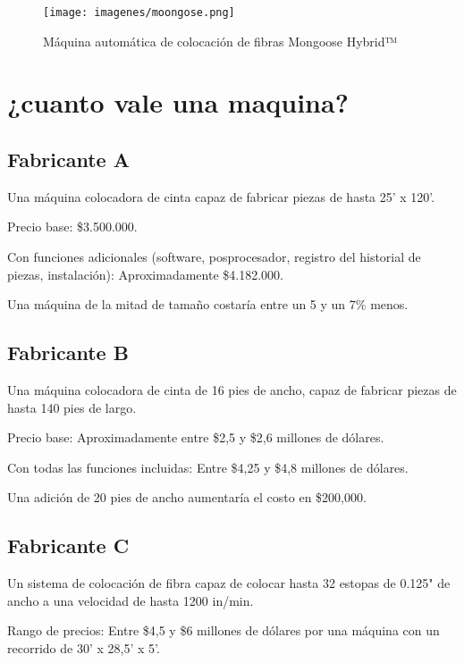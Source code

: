 \begin{enumerate}[label=\arabic*.]
\begin{figure}[h]
    \centering
    \texttt{[image: imagenes/moongose.png]}
    \caption{Máquina automática de colocación de fibras Mongoose Hybrid™}
    \label{fig:enter-label}
\end{figure}



\section{¿cuanto vale una maquina?}

\subsection{Fabricante A}

Una máquina colocadora de cinta capaz de fabricar piezas de hasta 25' x 120'.

Precio base: \$3.500.000.

Con funciones adicionales (software, posprocesador, registro del historial de piezas, instalación): Aproximadamente \$4.182.000.

Una máquina de la mitad de tamaño costaría entre un 5 y un 7\% menos.

\subsection{Fabricante B}

Una máquina colocadora de cinta de 16 pies de ancho, capaz de fabricar piezas de hasta 140 pies de largo.

Precio base: Aproximadamente entre \$2,5 y \$2,6 millones de dólares.

Con todas las funciones incluidas: Entre \$4,25 y \$4,8 millones de dólares.

Una adición de 20 pies de ancho aumentaría el costo en \$200,000.

\subsection*{Fabricante C}

Un sistema de colocación de fibra capaz de colocar hasta 32 estopas de 0.125" de ancho a una velocidad de hasta 1200 in/min.

Rango de precios: Entre \$4,5 y \$6 millones de dólares por una máquina con un recorrido de 30' x 28,5' x 5'.


\end{enumerate}
